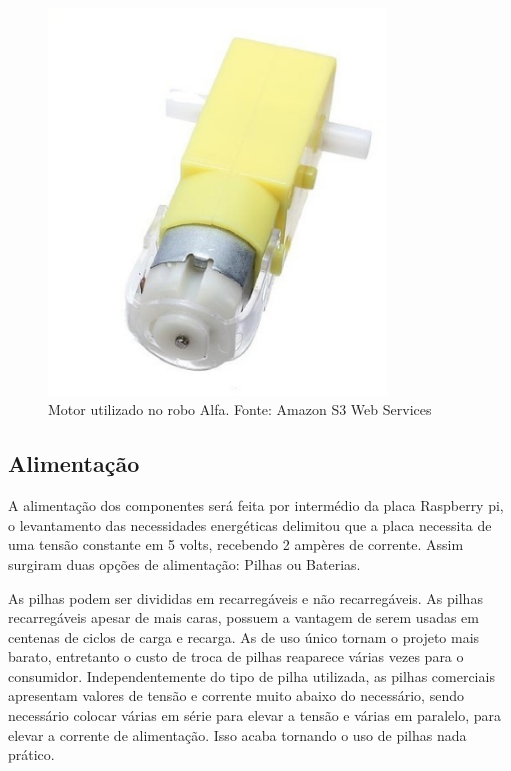 \begin{figure}[H]
    \centering
    \includegraphics[width=0.8\textwidth]{figuras/motor.eps}
    \caption{Motor utilizado no robo Alfa. Fonte: Amazon S3 Web Services}
    \label{fig:catia01}
\end{figure}

\subsection{Alimentação}

A alimentação dos componentes será feita por intermédio da placa Raspberry pi, o levantamento das necessidades energéticas delimitou que a placa necessita de uma tensão constante em 5 volts, recebendo 2 ampères de corrente.  Assim surgiram duas opções de alimentação: Pilhas ou Baterias.

As pilhas podem ser divididas em recarregáveis e não recarregáveis. As pilhas recarregáveis apesar de mais caras, possuem a vantagem de serem usadas em centenas de ciclos de carga e recarga. As de uso único tornam o projeto mais barato, entretanto o custo de troca de pilhas reaparece várias vezes para o consumidor. Independentemente do tipo de pilha utilizada, as pilhas comerciais apresentam valores de tensão e corrente muito abaixo do necessário, sendo necessário colocar várias em série para elevar a tensão e várias em paralelo, para elevar a corrente de alimentação. Isso acaba tornando o uso de pilhas nada prático.

